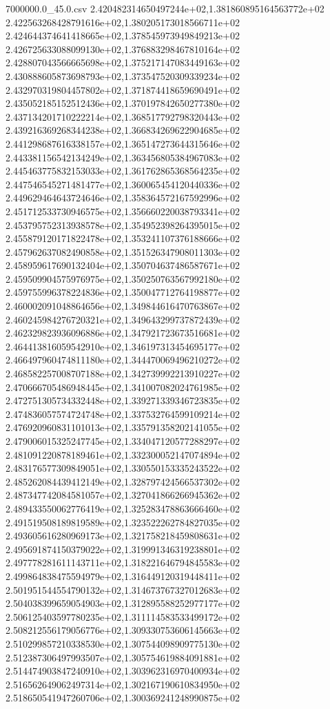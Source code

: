 \begin{filecontents*}{7000000.0_45.0.csv}
2.420482314650497244e+02,1.381860895164563772e+02
2.422563268428791616e+02,1.380205173018566711e+02
2.424644374641418665e+02,1.378545973949849213e+02
2.426725633088099130e+02,1.376883298467810164e+02
2.428807043566665698e+02,1.375217147083449163e+02
2.430888605873698793e+02,1.373547520309339234e+02
2.432970319804457802e+02,1.371874418659690491e+02
2.435052185152512436e+02,1.370197842650277380e+02
2.437134201710222214e+02,1.368517792798320443e+02
2.439216369268344238e+02,1.366834269622904685e+02
2.441298687616338157e+02,1.365147273644315646e+02
2.443381156542134249e+02,1.363456805384967083e+02
2.445463775832153033e+02,1.361762865368564235e+02
2.447546545271481477e+02,1.360065454120440336e+02
2.449629464643724646e+02,1.358364572167592996e+02
2.451712533730946575e+02,1.356660220038793341e+02
2.453795752313938578e+02,1.354952398264395015e+02
2.455879120171822478e+02,1.353241107376188666e+02
2.457962637082490858e+02,1.351526347908011303e+02
2.458959617690132404e+02,1.350704637486587671e+02
2.459509904575976975e+02,1.350250763567992180e+02
2.459755996378224836e+02,1.350047712764198877e+02
2.460002091048864656e+02,1.349844616470763867e+02
2.460245984276720321e+02,1.349643299737872439e+02
2.462329823936096886e+02,1.347921723673516681e+02
2.464413816059542910e+02,1.346197313454695177e+02
2.466497960474811180e+02,1.344470069496210272e+02
2.468582257008707188e+02,1.342739992213910227e+02
2.470666705486948445e+02,1.341007082024761985e+02
2.472751305734332448e+02,1.339271339346723835e+02
2.474836057574724748e+02,1.337532764599109214e+02
2.476920960831101013e+02,1.335791358202141055e+02
2.479006015325247745e+02,1.334047120577288297e+02
2.481091220878189461e+02,1.332300052147074894e+02
2.483176577309849051e+02,1.330550153335243522e+02
2.485262084439412149e+02,1.328797424566537302e+02
2.487347742084581057e+02,1.327041866266945362e+02
2.489433550062776419e+02,1.325283478863666460e+02
2.491519508189819589e+02,1.323522262784827035e+02
2.493605616280969173e+02,1.321758218459808631e+02
2.495691874150379022e+02,1.319991346319238801e+02
2.497778281611143711e+02,1.318221646794845583e+02
2.499864838475594979e+02,1.316449120319448411e+02
2.501951544554790132e+02,1.314673767327012683e+02
2.504038399659054903e+02,1.312895588252977177e+02
2.506125403597780235e+02,1.311114583533499172e+02
2.508212556179056776e+02,1.309330753606145663e+02
2.510299857210338530e+02,1.307544098909775130e+02
2.512387306497993507e+02,1.305754619884091881e+02
2.514474903847240910e+02,1.303962316970400934e+02
2.516562649062497314e+02,1.302167190610834950e+02
2.518650541947260706e+02,1.300369241248990875e+02

\end{filecontents*}
